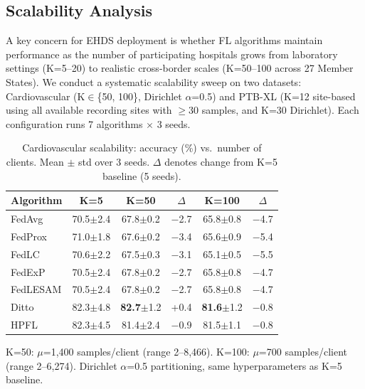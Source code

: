 \documentclass[conference,a4paper]{IEEEtran}
\begin{document}
\subsection{Scalability Analysis}
\label{sec:scalability}

A key concern for EHDS deployment is whether FL algorithms maintain performance as the number of participating hospitals grows from laboratory settings (K=5--20) to realistic cross-border scales (K=50--100 across 27 Member States). We conduct a systematic scalability sweep on two datasets: Cardiovascular (K$\in$\{50, 100\}, Dirichlet $\alpha$=0.5) and PTB-XL (K=12 site-based using all available recording sites with $\geq$30 samples, and K=30 Dirichlet). Each configuration runs 7 algorithms $\times$ 3 seeds.

\begin{table}[htbp]
\centering
\caption{Cardiovascular scalability: accuracy (\%) vs.\ number of clients. Mean $\pm$ std over 3 seeds. $\Delta$ denotes change from K=5 baseline (5 seeds).}
\label{tab:cv_scalability}
\small
\begin{tabular}{lccccc}
\toprule
\textbf{Algorithm} & \textbf{K=5} & \textbf{K=50} & \textbf{$\Delta$} & \textbf{K=100} & \textbf{$\Delta$} \\
\midrule
FedAvg & 70.5{\tiny$\pm$2.4} & 67.8{\tiny$\pm$0.2} & $-$2.7 & 65.8{\tiny$\pm$0.8} & $-$4.7 \\
FedProx & 71.0{\tiny$\pm$1.8} & 67.6{\tiny$\pm$0.2} & $-$3.4 & 65.6{\tiny$\pm$0.9} & $-$5.4 \\
FedLC & 70.6{\tiny$\pm$2.2} & 67.5{\tiny$\pm$0.3} & $-$3.1 & 65.1{\tiny$\pm$0.5} & $-$5.5 \\
FedExP & 70.5{\tiny$\pm$2.4} & 67.8{\tiny$\pm$0.2} & $-$2.7 & 65.8{\tiny$\pm$0.8} & $-$4.7 \\
FedLESAM & 70.5{\tiny$\pm$2.4} & 67.8{\tiny$\pm$0.2} & $-$2.7 & 65.8{\tiny$\pm$0.8} & $-$4.7 \\
\midrule
Ditto & 82.3{\tiny$\pm$4.8} & \textbf{82.7}{\tiny$\pm$1.2} & +0.4 & \textbf{81.6}{\tiny$\pm$1.2} & $-$0.8 \\
HPFL & 82.3{\tiny$\pm$4.5} & 81.4{\tiny$\pm$2.4} & $-$0.9 & 81.5{\tiny$\pm$1.1} & $-$0.8 \\
\bottomrule
\end{tabular}

\vspace{1mm}
\footnotesize{K=50: $\mu$=1,400 samples/client (range 2--8,466). K=100: $\mu$=700 samples/client (range 2--6,274). Dirichlet $\alpha$=0.5 partitioning, same hyperparameters as K=5 baseline.}
\end{table}
\end{document}
